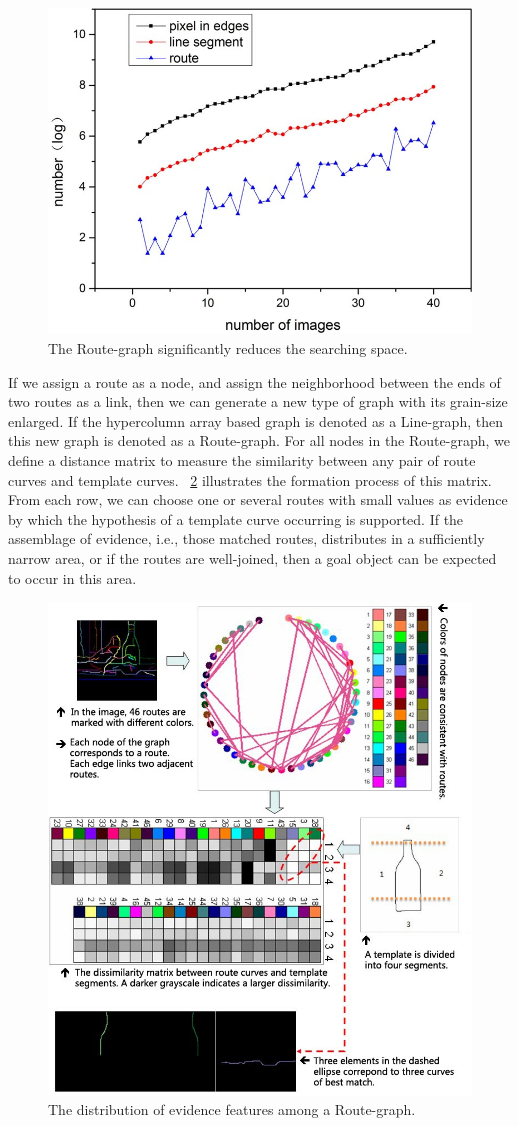 \documentclass{article}
\begin{document}
\begin{figure}[!t]
\centering
\includegraphics[width=0.6\linewidth]{images/fig14.jpg}
\caption{The Route-graph significantly reduces the searching space.}
\label{fig:14}
\end{figure}

If we assign a route as a node, and assign the neighborhood between the ends of two routes as a link, 
then we can generate a new type of graph with its grain-size enlarged. 
If the hypercolumn array based graph is denoted as a Line-graph, then this new graph is denoted as a Route-graph. 
For all nodes in the Route-graph, we define a distance matrix to measure the similarity between any pair of route curves and template curves. 
\figurename~\ref{fig:15} illustrates the formation process of this matrix. 
From each row, we can choose one or several routes with small values as evidence by which the hypothesis of a template curve occurring is supported. 
If the assemblage of evidence, i.e., those matched routes, distributes in a sufficiently narrow area, 
or if the routes are well-joined, then a goal object can be expected to occur in this area.

\begin{figure}[!t]
\centering
\includegraphics[width=0.9\linewidth]{images/fig15.jpg}
\caption{The distribution of evidence features among a Route-graph.}
\label{fig:15}
\end{figure}
\end{document}
